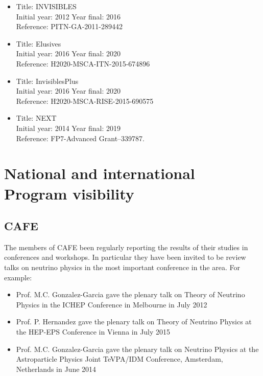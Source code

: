 \documentclass[a4paper,11pt,oneside]{article}
\begin{document}
\begin{itemize}
\item 
Title: INVISIBLES\\
Initial year: 2012 Year final: 2016\\
Reference: PITN-GA-2011-289442\\
\item 
Title: 	Elusives\\
Initial year: 2016 Year final: 2020\\
Reference: H2020-MSCA-ITN-2015-674896 \\
\item  Title: 	InvisiblesPlus\\
Initial year: 2016 Year final: 2020\\
Reference: H2020-MSCA-RISE-2015-690575\\
\item Title: NEXT \\
Initial year: 2014 Year final: 2019\\
Reference: FP7-Advanced Grant--339787.
\end{itemize}

\section{\bf \textsf{National and international Program visibility}}

\label{sec.visibility}

\subsection*{CAFE}
The members of CAFE been regularly reporting the results of their 
studies in  conferences and workshops. In particular they have been invited to
be review talks on neutrino physics in the most important conference
in the area. For example:
\begin{itemize}
\item Prof. M.C. Gonzalez-Garcia gave the plenary talk on Theory of Neutrino
Physics in the ICHEP Conference in Melbourne in July 2012
\item Prof. P. Hernandez gave the plenary talk on Theory of Neutrino Physics
at the HEP-EPS Conference in Vienna in July 2015 
\item Prof. M.C. Gonzalez-Garcia gave the plenary talk on Neutrino Physics
at the  Astroparticle Physics Joint  TeVPA/IDM Conference, Amsterdam, 
Netherlands in June 2014
\end{itemize}
\end{document}
